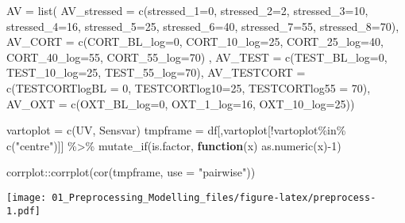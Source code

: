 \documentclass[
]{article}
\newenvironment{Shaded}{\begin{snugshade}}{\end{snugshade}}
\newcommand{\AttributeTok}[1]{\textcolor[rgb]{0.77,0.63,0.00}{#1}}
\newcommand{\ControlFlowTok}[1]{\textcolor[rgb]{0.13,0.29,0.53}{\textbf{#1}}}
\newcommand{\DecValTok}[1]{\textcolor[rgb]{0.00,0.00,0.81}{#1}}
\newcommand{\FunctionTok}[1]{\textcolor[rgb]{0.00,0.00,0.00}{#1}}
\newcommand{\NormalTok}[1]{#1}
\newcommand{\OtherTok}[1]{\textcolor[rgb]{0.56,0.35,0.01}{#1}}
\newcommand{\SpecialCharTok}[1]{\textcolor[rgb]{0.00,0.00,0.00}{#1}}
\newcommand{\StringTok}[1]{\textcolor[rgb]{0.31,0.60,0.02}{#1}}
\begin{document}
\begin{Shaded}
\begin{Highlighting}[]
\NormalTok{AV }\OtherTok{=} \FunctionTok{list}\NormalTok{(}
\AttributeTok{AV\_stressed =} \FunctionTok{c}\NormalTok{(}\AttributeTok{stressed\_1=}\DecValTok{0}\NormalTok{, }\AttributeTok{stressed\_2=}\DecValTok{2}\NormalTok{,}
                \AttributeTok{stressed\_3=}\DecValTok{10}\NormalTok{, }\AttributeTok{stressed\_4=}\DecValTok{16}\NormalTok{,}
                \AttributeTok{stressed\_5=}\DecValTok{25}\NormalTok{, }\AttributeTok{stressed\_6=}\DecValTok{40}\NormalTok{, }
                \AttributeTok{stressed\_7=}\DecValTok{55}\NormalTok{, }\AttributeTok{stressed\_8=}\DecValTok{70}\NormalTok{), }
\AttributeTok{AV\_CORT =} \FunctionTok{c}\NormalTok{(}\AttributeTok{CORT\_BL\_log=}\DecValTok{0}\NormalTok{, }\AttributeTok{CORT\_10\_log=}\DecValTok{25}\NormalTok{, }\AttributeTok{CORT\_25\_log=}\DecValTok{40}\NormalTok{, }\AttributeTok{CORT\_40\_log=}\DecValTok{55}\NormalTok{, }\AttributeTok{CORT\_55\_log=}\DecValTok{70}\NormalTok{) ,}
\AttributeTok{AV\_TEST =} \FunctionTok{c}\NormalTok{(}\AttributeTok{TEST\_BL\_log=}\DecValTok{0}\NormalTok{, }\AttributeTok{TEST\_10\_log=}\DecValTok{25}\NormalTok{, }\AttributeTok{TEST\_55\_log=}\DecValTok{70}\NormalTok{),}
\AttributeTok{AV\_TESTCORT =} \FunctionTok{c}\NormalTok{(}\AttributeTok{TESTCORTlogBL =} \DecValTok{0}\NormalTok{, }\AttributeTok{TESTCORTlog10=}\DecValTok{25}\NormalTok{, }\AttributeTok{TESTCORTlog55 =} \DecValTok{70}\NormalTok{),}
\AttributeTok{AV\_OXT =}  \FunctionTok{c}\NormalTok{(}\AttributeTok{OXT\_BL\_log=}\DecValTok{0}\NormalTok{, }\AttributeTok{OXT\_1\_log=}\DecValTok{16}\NormalTok{, }\AttributeTok{OXT\_10\_log=}\DecValTok{25}\NormalTok{))}

\NormalTok{vartoplot }\OtherTok{=} \FunctionTok{c}\NormalTok{(UV, Sensvar)}
\NormalTok{tmpframe }\OtherTok{=}\NormalTok{ df[,vartoplot[}\SpecialCharTok{!}\NormalTok{vartoplot}\SpecialCharTok{\%in\%} \FunctionTok{c}\NormalTok{(}\StringTok{"centre"}\NormalTok{)]] }\SpecialCharTok{\%\textgreater{}\%} \FunctionTok{mutate\_if}\NormalTok{(is.factor, }\ControlFlowTok{function}\NormalTok{(x) }\FunctionTok{as.numeric}\NormalTok{(x)}\SpecialCharTok{{-}}\DecValTok{1}\NormalTok{)}

\NormalTok{corrplot}\SpecialCharTok{::}\FunctionTok{corrplot}\NormalTok{(}\FunctionTok{cor}\NormalTok{(tmpframe, }\AttributeTok{use =} \StringTok{"pairwise"}\NormalTok{))}
\end{Highlighting}
\end{Shaded}

\texttt{[image: 01\_Preprocessing\_Modelling\_files/figure-latex/preprocess-1.pdf]}
\end{document}
